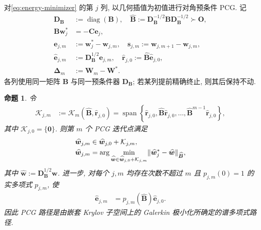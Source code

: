 \documentclass{ctexart}
\newcommand{\q}{\quad}
\DeclareMathOperator{\diag}{diag}
\DeclarePairedDelimiter\norm{\lVert}{\rVert}
\newtheorem{proposition}[theorem]{命题}
\begin{document}
对\cref{eq:energy-minimizer} 的第 $j$ 列, 以几何插值为初值进行对角预条件 PCG. 记
\begin{align}
    \bm D_{\bm B}&:=\diag(\bm B),\q
    \widehat{\bm B}:=\bm D_{\bm B}^{-1/2}\bm B\bm D_{\bm B}^{-1/2}\succ\mathbf O,
    \label{eq:pcg-symmetric-preconditioned-B}\\
    \bm B\bm w_j^{\ast}&=-\bm C\bm e_j,
    \label{eq:pcg-column-system}\\
    \bm e_{j,m}&:=\bm w_j^{\ast}-\bm w_{j,m},\q
    \bm s_{j,m}:=\bm w_{j,m+1}-\bm w_{j,m},
    \label{eq:pcg-column-error-step}\\
    \widehat{\bm e}_{j,m}&:=\bm D_{\bm B}^{1/2}\bm e_{j,m},\q
    \widehat{\bm r}_{j,0}:=\widehat{\bm B}\widehat{\bm e}_{j,0},
    \label{eq:pcg-preconditioned-error-residual}\\
    \bm\Delta_m&:=\bm W_m-\bm W^{\ast}.
    \label{eq:pcg-matrix-error}
\end{align}
各列使用同一矩阵 $\bm B$ 与同一预条件器 $\bm D_{\bm B}$; 若某列提前精确终止, 则其后保持不动.

\begin{proposition}
\label{prop:pcg-krylov-characterization}
令
\begin{align}
    \mathcal K_{j,m}
    &:=
    \mathcal K_m(\widehat{\bm B},\widehat{\bm r}_{j,0})
    =
    \operatorname{span}\left\{
      \widehat{\bm r}_{j,0},
      \widehat{\bm B}\widehat{\bm r}_{j,0},
      \ldots,
      \widehat{\bm B}^{m-1}\widehat{\bm r}_{j,0}
    \right\},
    \label{eq:pcg-column-krylov-space}
\end{align}
其中 $\mathcal K_{j,0}=\{\mathbf0\}$. 则第 $m$ 个 PCG 迭代点满足
\begin{align}
    \widehat{\bm w}_{j,m}
    &\in\widehat{\bm w}_{j,0}+\mathcal K_{j,m},
    \label{eq:pcg-affine-krylov-membership}\\
    \widehat{\bm w}_{j,m}
    &=
    \arg\min_{\widehat{\bm w}\in
    \widehat{\bm w}_{j,0}+\mathcal K_{j,m}}
    \norm{\widehat{\bm w}_j^\ast-\widehat{\bm w}}_{\widehat{\bm B}},
    \label{eq:pcg-krylov-minimizer}
\end{align}
其中 $\widehat{\bm w}:=\bm D_{\bm B}^{1/2}\bm w$. 进一步, 对每个 $j,m$ 均存在次数不超过 $m$ 且 $p_{j,m}(0)=1$ 的实多项式 $p_{j,m}$, 使
\begin{align}
    \widehat{\bm e}_{j,m}
    &=
    p_{j,m}(\widehat{\bm B})\widehat{\bm e}_{j,0}.
    \label{eq:pcg-error-polynomial}
\end{align}
因此 PCG 路径是由嵌套 Krylov 子空间上的 Galerkin 极小化所确定的谱多项式路径.
\end{proposition}
\end{document}

